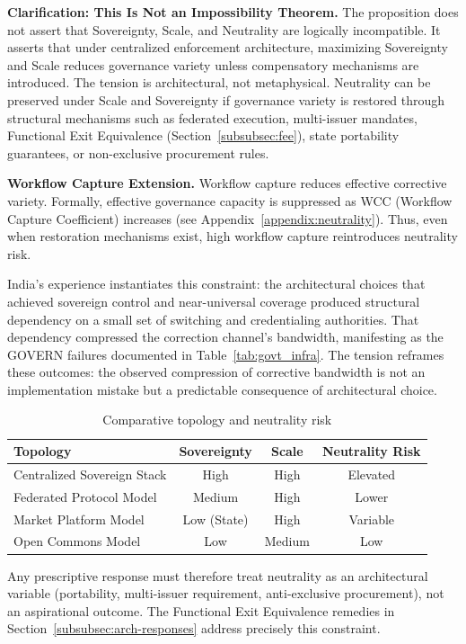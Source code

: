 \documentclass{article}
\begin{document}
\textbf{Clarification: This Is Not an Impossibility Theorem.} The proposition does not assert that Sovereignty, Scale, and Neutrality are logically incompatible. It asserts that under centralized enforcement architecture, maximizing Sovereignty and Scale reduces governance variety unless compensatory mechanisms are introduced. The tension is architectural, not metaphysical. Neutrality can be preserved under Scale and Sovereignty if governance variety is restored through structural mechanisms such as federated execution, multi-issuer mandates, Functional Exit Equivalence (Section~\ref{subsubsec:fee}), state portability guarantees, or non-exclusive procurement rules.

\textbf{Workflow Capture Extension.} Workflow capture reduces effective corrective variety. Formally, effective governance capacity is suppressed as WCC (Workflow Capture Coefficient) increases (see Appendix~\ref{appendix:neutrality}). Thus, even when restoration mechanisms exist, high workflow capture reintroduces neutrality risk.

India's experience instantiates this constraint: the architectural choices that achieved sovereign control and near-universal coverage produced structural dependency on a small set of switching and credentialing authorities. That dependency compressed the correction channel's bandwidth, manifesting as the GOVERN failures documented in Table~\ref{tab:govt_infra}. The tension reframes these outcomes: the observed compression of corrective bandwidth is not an implementation mistake but a predictable consequence of architectural choice.

\begin{table}[htbp]
\centering
\small
\caption{Comparative topology and neutrality risk}
\label{tab:topology-risk}
\begin{tabular}{lccc}
\toprule
\textbf{Topology} & \textbf{Sovereignty} & \textbf{Scale} & \textbf{Neutrality Risk} \\
\midrule
Centralized Sovereign Stack & High & High & Elevated \\
Federated Protocol Model & Medium & High & Lower \\
Market Platform Model & Low (State) & High & Variable \\
Open Commons Model & Low & Medium & Low \\
\bottomrule
\end{tabular}
\end{table}

Any prescriptive response must therefore treat neutrality as an architectural variable (portability, multi-issuer requirement, anti-exclusive procurement), not an aspirational outcome. The Functional Exit Equivalence remedies in Section~\ref{subsubsec:arch-responses} address precisely this constraint.
\end{document}
